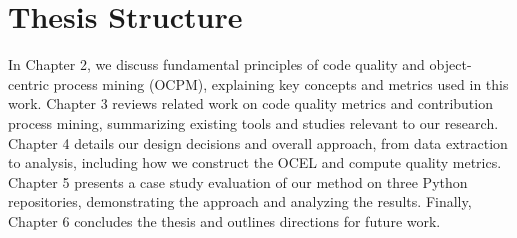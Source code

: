\section{Thesis Structure}
In Chapter 2, we discuss fundamental principles of code quality and object-centric process mining (OCPM), explaining key concepts and metrics used in this work. Chapter 3 reviews related work on code quality metrics and contribution process mining, summarizing existing tools and studies relevant to our research. Chapter 4 details our design decisions and overall approach, from data extraction to analysis, including how we construct the OCEL and compute quality metrics. Chapter 5 presents a case study evaluation of our method on three Python repositories, demonstrating the approach and analyzing the results. Finally, Chapter 6 concludes the thesis and outlines directions for future work.
